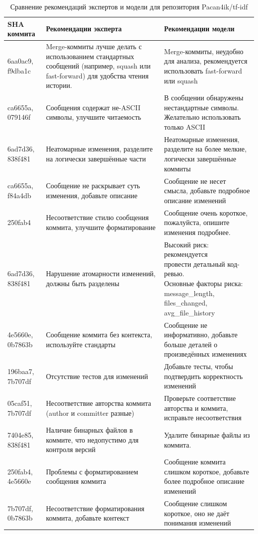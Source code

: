 \begin{itemize}
\begin{table}[h!]
	\centering
	\caption{Сравнение рекомендаций экспертов и модели для репозитория Pacan4ik/tf-idf}
	\label{tab:expert_vs_model_recommendations}
	\small
	\begin{tabularx}{\textwidth}{|p{2.5cm}|X|X|}
		\hline
		\textbf{SHA коммита} & \textbf{Рекомендации эксперта} & \textbf{Рекомендации модели} \\
		\hline
		6aa0ac9, f9dba1c & Merge-коммиты лучше делать с использованием стандартных сообщений (например, squash или fast-forward) для удобства чтения истории. & Merge-коммиты, неудобно для анализа, рекомендуется использовать fast-forward или squash \\
		\hline
		ca6655a, 079146f & Сообщения содержат не-ASCII символы, улучшите читаемость & В сообщении обнаружены нестандартные символы. Желательно использовать только ASCII \\
		\hline
		6ad7d36, 838f481 & Неатомарные изменения, разделите на логически завершённые части & Неатомарные изменения, разделите на более мелкие, логически завершённые коммиты \\
		\hline
		ca6655a, f84a4db & Сообщение не раскрывает суть изменения, добавьте описание & Сообщение не несет смысла, добавьте подробное описание изменений \\
		\hline
		250fab4 & Несоответствие стилю сообщения коммита, улучшите форматирование & Сообщение очень короткое, пожалуйста, опишите изменения подробнее.\\
		\hline
		6ad7d36, 838f481 & Нарушение атомарности изменений, должны быть разделены & \makecell[tl]{Высокий риск: рекомендуется\\ провести детальный код-ревью.\\Основные факторы риска:\\ message\_length, files\_changed,\\ avg\_file\_history} \\
		\hline
		4e5660e, 0b7863b & Сообщение коммита без контекста, используйте стандарты & Сообщение не информативно, добавьте больше деталей о произведённых изменениях \\
		\hline
		196baa7, 7b707df & Отсутствие тестов для изменений & Добавьте тесты, чтобы подтвердить корректность изменений \\
		\hline
		05caf51, 7b707df & Несоответствие авторства коммита (author и committer разные) & Проверьте соответствие авторства и коммита, исправьте несоответствия \\
		\hline
		7404e85, 838f481 & Наличие бинарных файлов в коммите, что недопустимо для контроля версий & Удалите бинарные файлы из коммита. \\
		\hline
		250fab4, 4e5660e & Проблемы с форматированием сообщения коммита & Сообщение коммита слишком короткое, добавьте более подробное описание изменений \\
		\hline
		7b707df, 0b7863b & Несоответствие форматирования коммита, добавьте контекст & Сообщение слишком короткое, оно не даёт понимания изменений \\
		\hline
	\end{tabularx}
\end{table}


\end{itemize}
